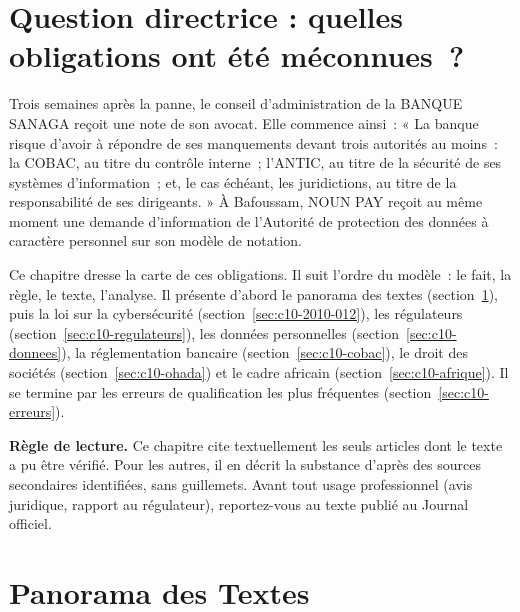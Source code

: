 \bigskip

\section*{Question directrice : quelles obligations ont été méconnues~?}

Trois semaines après la panne, le conseil d'administration de la BANQUE
SANAGA reçoit une note de son avocat. Elle commence ainsi~: « La banque
risque d'avoir à répondre de ses manquements devant trois autorités au
moins~: la COBAC, au titre du contrôle interne~; l'ANTIC, au titre de la
sécurité de ses systèmes d'information~; et, le cas échéant, les
juridictions, au titre de la responsabilité de ses dirigeants. » À
Bafoussam, NOUN PAY reçoit au même moment une demande d'information de
l'Autorité de protection des données à caractère personnel sur son
modèle de notation.

Ce chapitre dresse la carte de ces obligations. Il suit l'ordre du
modèle~: le fait, la règle, le texte, l'analyse. Il présente d'abord le
panorama des textes (section~\ref{sec:c10-panorama}), puis la loi sur la
cybersécurité (section~\ref{sec:c10-2010-012}), les régulateurs
(section~\ref{sec:c10-regulateurs}), les données personnelles
(section~\ref{sec:c10-donnees}), la réglementation bancaire
(section~\ref{sec:c10-cobac}), le droit des sociétés
(section~\ref{sec:c10-ohada}) et le cadre africain
(section~\ref{sec:c10-afrique}). Il se termine par les erreurs de
qualification les plus fréquentes (section~\ref{sec:c10-erreurs}).

\begin{boxalert}
\textbf{Règle de lecture.} Ce chapitre cite textuellement les seuls
articles dont le texte a pu être vérifié. Pour les autres, il en décrit la
substance d'après des sources secondaires identifiées, sans guillemets.
Avant tout usage professionnel (avis juridique, rapport au régulateur),
reportez-vous au texte publié au Journal officiel.
\end{boxalert}

\separateur

\section{Panorama des Textes}
\label{sec:c10-panorama}


